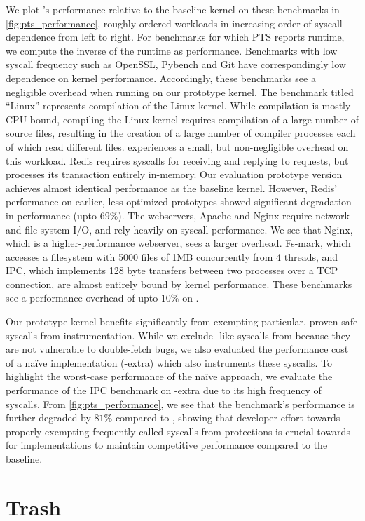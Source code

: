 \documentclass[letterpaper,twocolumn,10pt, anonymous]{article}
\begin{document}
We plot \tiktok's performance relative to the baseline kernel on
these benchmarks in \autoref{fig:pts_performance}, roughly ordered 
workloads in increasing order of syscall dependence from left to right.
For benchmarks for which PTS reports runtime, we compute the inverse 
of the runtime as performance.
Benchmarks with low syscall frequency such as OpenSSL, 
Pybench and Git have correspondingly low dependence on kernel performance.
Accordingly, these benchmarks see a negligible overhead when running 
on our prototype kernel.
The benchmark titled ``Linux'' represents compilation of the Linux kernel.
While compilation is mostly CPU bound, compiling the Linux kernel requires 
compilation of a large number of source files, resulting in the creation 
of a large number of compiler processes each of which read different files. 
\tiktok experiences a small, but non-negligible overhead on this workload.
Redis requires syscalls for receiving and replying to requests, but 
processes its transaction entirely in-memory. 
Our evaluation prototype version achieves almost identical performance
as the baseline kernel.
However, Redis' performance on earlier, less optimized prototypes showed
significant degradation in performance (upto $69\%$).
The webservers, Apache and Nginx require network and file-system I/O, 
and rely heavily on syscall performance. 
We see that Nginx, which is a higher-performance webserver, sees a larger
overhead.
Fs-mark, which accesses a filesystem with 5000 files of 1MB concurrently
from 4 threads, and IPC, which implements 128 byte transfers between 
two processes over a TCP connection, are almost entirely bound by kernel 
performance. 
These benchmarks see a performance overhead of upto $10\%$ on \tiktok.

Our prototype \tiktok kernel benefits significantly from 
exempting particular, proven-safe syscalls from instrumentation.
While we exclude -like syscalls from \tiktok because they 
are not vulnerable to double-fetch bugs, we also evaluated the
performance cost of a na\"ive implementation (\tiktok-extra)
which also instruments these syscalls.
To highlight the worst-case performance of the na\"ive approach, we 
evaluate the performance of the IPC benchmark on \tiktok-extra due 
to its high frequency of  syscalls.
From \autoref{fig:pts_performance}, we see that the benchmark's 
performance is further degraded by $81\%$ compared to \tiktok, 
showing that developer effort towards properly exempting 
frequently called syscalls from \tiktok protections is crucial
towards for implementations to maintain competitive performance
compared to the baseline.

\section{Trash}






\end{document}
